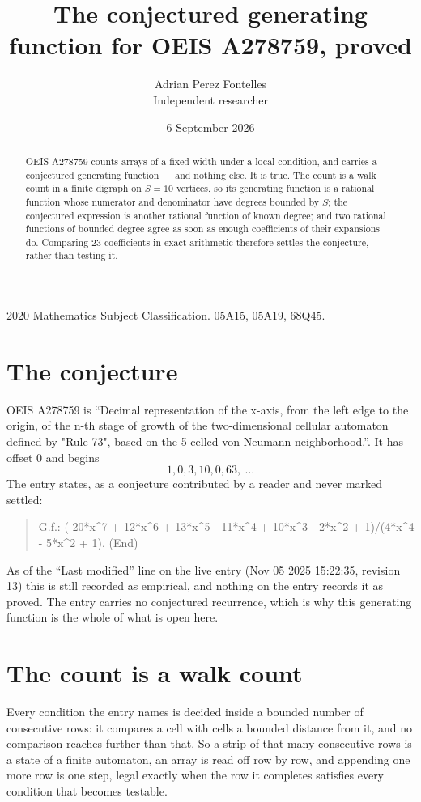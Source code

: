\documentclass[11pt,a4paper]{article}
\title{The conjectured generating function for OEIS A278759, proved}
\author{Adrian Perez Fontelles\\ \small Independent researcher}
\date{6 September 2026}
\theoremstyle{plain}
\theoremstyle{definition}
\begin{document}
\maketitle

\begin{abstract}
OEIS A278759 counts arrays of a fixed width under a local condition, and carries a conjectured
generating function --- and nothing else. It is true. The count is a walk count in a finite
digraph on $S=10$ vertices, so its generating function is a rational function whose numerator
and denominator have degrees bounded by $S$; the conjectured expression is another rational
function of known degree; and two rational functions of bounded degree agree as soon as enough
coefficients of their expansions do. Comparing $23$ coefficients in exact arithmetic
therefore settles the conjecture, rather than testing it.
\end{abstract}

\noindent\small 2020 Mathematics Subject Classification. 05A15, 05A19, 68Q45.\normalsize

\section{The conjecture}

OEIS A278759 is ``Decimal representation of the x-axis, from the left edge to the origin, of the n-th stage of growth of the two-dimensional cellular automaton defined by "Rule 73", based on the 5-celled von Neumann neighborhood.''. It has offset $0$ and begins
\[
1, 0, 3, 10, 0, 63,\ \dots
\]
The entry states, as a conjecture contributed by a reader and never marked settled:
\begin{quote}
G.f.: (-20*x\^{}7 + 12*x\^{}6 + 13*x\^{}5 - 11*x\^{}4 + 10*x\^{}3 - 2*x\^{}2 + 1)/(4*x\^{}4 - 5*x\^{}2 + 1). (End)
\end{quote}
As of the ``Last modified'' line on the live entry (Nov 05 2025 15:22:35, revision 13) this is still
recorded as empirical, and nothing on the entry records it as proved. The entry carries no
conjectured recurrence, which is why this generating function is the whole of what is open
here.

\section{The count is a walk count}

Every condition the entry names is decided inside a bounded number of consecutive rows: it
compares a cell with cells a bounded distance from it, and no comparison reaches further than
that. So a strip of that many consecutive rows is a state of a finite automaton, an array is
read off row by row, and appending one more row is one step, legal exactly when the row it
completes satisfies every condition that becomes testable.
\end{document}
